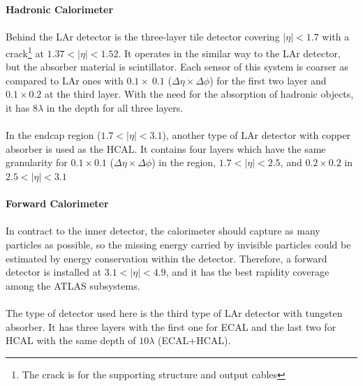 \\
\\{\bf Hadronic Calorimeter}
\\
\\Behind the LAr detector is the three-layer tile detector covering $|\eta|<1.7$ with a crack\footnote{The crack is for the supporting structure and output cables} at $1.37<|\eta|<1.52$. It operates in the similar way to the LAr detector, but the absorber material is scintillator. Each sensor of this system is coarser as compared to LAr ones with $0.1 \times ~0.1$ ($\Delta \eta \times \Delta \phi$) for the first two layer and $0.1 \times 0.2$ at the third layer. With the need for the absorption of hadronic objects, it has $8 \lambda$ in the depth for all three layers.
\\
\\In the endcap region ($1.7<|\eta|<3.1$), another type of LAr detector with copper absorber is used as the HCAL. It contains four layers which have the same granularity for $0.1 \times 0.1$ ($\Delta \eta \times \Delta \phi$) in the region, $1.7<|\eta|<2.5$, and $0.2 \times 0.2$ in $2.5<|\eta|<3.1$
\\
\\{\bf Forward Calorimeter \cite{Artamonov_2008}}
\\
\\In contract to the inner detector, the calorimeter should capture as many particles as possible, so the missing energy carried by invisible particles could be estimated by energy conservation within the detector. Therefore, a forward detector is installed at $3.1<|\eta|<4.9$, and it has the best rapidity coverage among the ATLAS subsystems. 
\\
\\The type of detector used here is the third type of LAr detector with tungsten absorber. It has three layers with the first one for ECAL and the last two for HCAL with the same depth of $10\lambda$ (ECAL+HCAL).  
